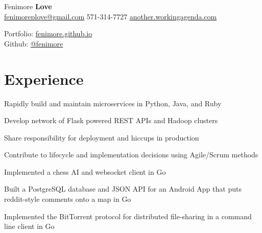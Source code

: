 \documentclass[]{deedy-resume-openfont}
\begin{document}
%
%

%
%
\hspace{-5.5mm}
\begin{minipage}[t]{.6\textwidth}
{\Huge Fenimore {\textbf{Love}}}\\
\href{mailto:fenimoreplove@gmail.com}{fenimoreplove@gmail.com} \textbullet{} 571-314-7727 \textbullet{} \href{http://another.workingagenda.com}{another.workingagenda.com}\\
\end{minipage}
\hfill
\begin{minipage}[t]{.3\textwidth}
Portfolio: \href{https://fenimore.github.io}{fenimore.github.io}\\
Github: \href{https://github.com/fenimore}{@fenimore}
\end{minipage}
\namesection{}{} %


\section{Experience}
\begin{tightemize}
\item Rapidly build and maintain microservices in Python, Java, and Ruby
\item Develop network of Flask powered REST APIs and Hadoop clusters
\item Share responsibility for deployment and hiccups in production
\item Contribute to lifecycle and implementation decisions using Agile/Scrum methods
\end{tightemize}
\sectionsep

\begin{tightemize}
\item Implemented a chess AI and websocket client in Go
\item Built a PostgreSQL database and JSON API for an Android App that puts reddit-style comments onto a map in Go
\item Implemented the BitTorrent protocol for distributed file-sharing in a command line client in Go
\end{tightemize}
\sectionsep
\end{document}
